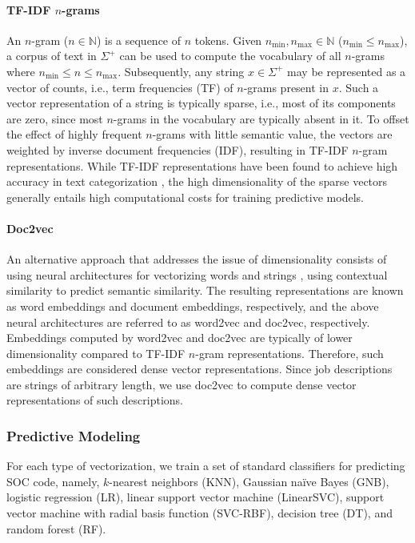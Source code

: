 \paragraph{TF-IDF $n$-grams} An $n$-gram ($n \in \mathbb{N}$) is a sequence of $n$ tokens. Given $n_{\mathrm{min}}, n_{\mathrm{max}} \in \mathbb{N}$ ($n_{\mathrm{min}} \leq n_{\mathrm{max}}$), a corpus of text in $\Sigma^+$ can be used to compute the vocabulary of all $n$-grams where $n_{\mathrm{min}} \leq n \leq  n_{\mathrm{max}}$. Subsequently, any string $x \in \Sigma^+$ may be represented as a vector of counts, i.e., term frequencies (TF) of $n$-grams present in $x$. Such a vector representation of a string is typically sparse, i.e., most of its components are zero, since most $n$-grams in the vocabulary are typically absent in it. To offset the effect of highly frequent $n$-grams with little semantic value, the vectors are weighted by inverse document frequencies (IDF), resulting in TF-IDF $n$-gram representations.
While TF-IDF representations have been found to achieve high accuracy in text categorization \cite{DBLP:conf/ecml/Joachims98}, the high dimensionality of the sparse vectors generally entails high computational costs for training predictive models.
\paragraph{Doc2vec} An alternative approach that addresses the issue of dimensionality consists of using neural architectures for vectorizing words \cite{mikolov2013efficient} and strings \cite{DBLP:conf/icml/LeM14}, using contextual similarity to predict semantic similarity. The resulting representations are known as word embeddings and document embeddings, respectively, and the above neural architectures are referred to as word2vec and doc2vec, respectively. Embeddings computed by word2vec and doc2vec are typically of lower dimensionality compared to TF-IDF $n$-gram representations. Therefore, such embeddings are considered dense vector representations. Since job descriptions are strings of arbitrary length, we use doc2vec to compute dense vector representations of such descriptions.

\subsubsection{Predictive Modeling}
For each type of vectorization, we train a set of standard classifiers for predicting SOC code, namely, $k$-nearest neighbors (KNN), Gaussian na\"ive Bayes (GNB), logistic regression (LR), linear support vector machine (LinearSVC), support vector machine with radial basis function (SVC-RBF), decision tree (DT), and random forest (RF).

